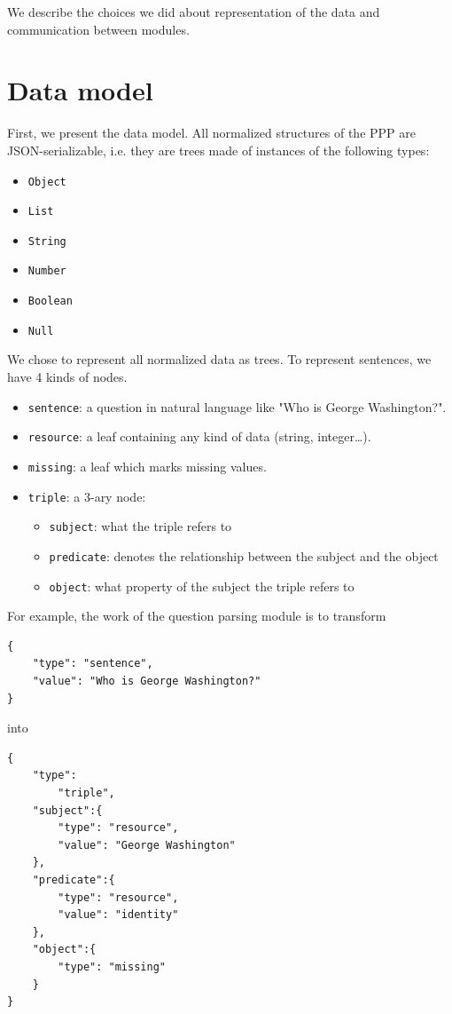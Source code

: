 We describe the choices we did about representation of the data and communication between modules.

\section{Data model}
\label{rdf}

First, we present the data model. All normalized structures of the PPP are JSON-serializable, i.e. they are trees made of instances of the following types:
\begin{itemize}
    \item \texttt{Object}
    \item \texttt{List}
    \item \texttt{String}
    \item \texttt{Number}
    \item \texttt{Boolean}
    \item \texttt{Null}
\end{itemize}

We chose to represent all normalized data as trees. To represent sentences, we have 4 kinds of nodes.

\begin{itemize}
    \item \texttt{sentence}: a question in natural language like "Who is George Washington?".
    \item \texttt{resource}: a leaf containing any kind of data (string, integer\ldots).
    \item \texttt{missing}: a leaf which marks missing values.
    \item \texttt{triple}: a 3-ary node:
        \begin{itemize}
            \item \texttt{subject}: what the triple refers to
            \item \texttt{predicate}: denotes the relationship between the subject and the
  object
            \item \texttt{object}: what property of the subject the triple refers to
        \end{itemize}         
\end{itemize}

For example, the work of the question parsing module is to transform 
\begin{verbatim}
{
    "type": "sentence", 
    "value": "Who is George Washington?"
}
\end{verbatim}
into 
\begin{verbatim}
{
    "type":
        "triple",
    "subject":{
        "type": "resource",
        "value": "George Washington"
    },
    "predicate":{
        "type": "resource",
        "value": "identity"
    },
    "object":{
        "type": "missing"
    }
}
\end{verbatim}

